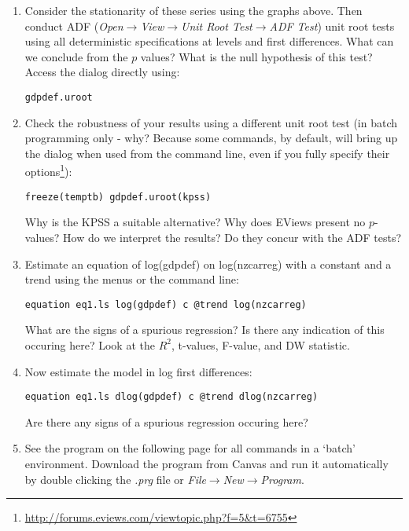 \documentclass[a4paper,10pt]{article}
\begin{document}
\begin{enumerate}
\item Consider the stationarity of these series using the graphs above. Then conduct ADF (\emph{Open}$\rightarrow$\emph{View}$\rightarrow$\emph{Unit Root Test}$\rightarrow$\emph{ADF Test}) unit root tests using all deterministic specifications at levels and first differences. What can we conclude from the $p$ values? What is the null hypothesis of this test? Access the dialog directly using:
\begin{center}
\texttt{gdpdef.uroot}
\end{center}
\item Check the robustness of your results using a different unit root test (in batch programming only - why? Because some commands, by default, will bring up the dialog when used from the command line, even if you fully specify their options\footnote{\url{http://forums.eviews.com/viewtopic.php?f=5\&t=6755}}):
\begin{center}
\texttt{freeze(temptb) gdpdef.uroot(kpss)} 
\end{center}
 Why is the KPSS a suitable alternative? Why does EViews present no $p$-values? How do we interpret the results? Do they concur with the ADF tests?
 \item Estimate an equation of log(gdpdef) on log(nzcarreg) with a constant and a trend using the menus or the command line:
 \begin{center}
\texttt{equation eq1.ls log(gdpdef) c @trend log(nzcarreg)}
\end{center}
 What are the signs of a spurious regression? Is there any indication of this occuring here? Look at the $R^2$, t-values, F-value, and DW statistic.
 \item Now estimate the model in log first differences:
 \begin{center}
\texttt{equation eq1.ls dlog(gdpdef) c @trend dlog(nzcarreg)}
\end{center}
Are there any signs of a spurious regression occuring here?
\item See the program on the following page for all commands in a `batch' environment. Download the program from Canvas and run it automatically by double clicking the \emph{.prg} file or \emph{File}$\rightarrow$\emph{New}$\rightarrow$\emph{Program}.
\end{enumerate}
\newpage
\end{document}
